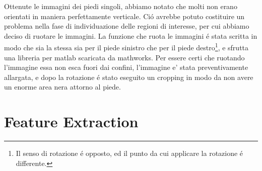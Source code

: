 \documentclass[11pt,twoside,a4paper]{article}
\begin{document}


Ottenute le immagini dei piedi singoli, abbiamo notato che molti non erano orientati in maniera perfettamente verticale. Ci\'o avrebbe potuto costituire un problema nella fase di individuazione delle regioni di interesse, per cui abbiamo deciso di ruotare le immagini. La funzione che ruota le immagini \'e stata scritta in modo che sia la stessa sia per il piede sinistro che per il piede destro\footnote{Il senso di rotazione \'e opposto, ed il punto da cui applicare la rotazione \'e differente.}, e sfrutta una libreria per matlab scaricata da mathworks. Per essere certi che ruotando l'immagine essa non esca fuori dai confini, l'immagine e' stata preventivamente allargata, e dopo la rotazione \'e stato eseguito un cropping in modo da non avere un enorme area nera attorno al piede.
\section{Feature Extraction}

\label{sec:implementation}
\end{document}
